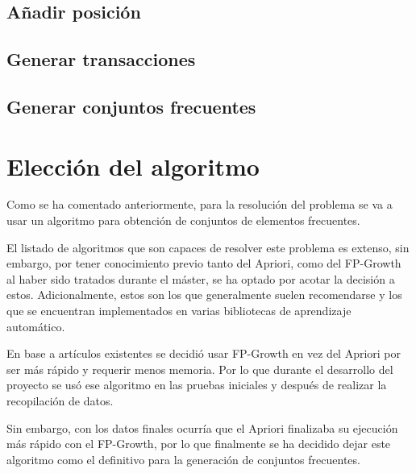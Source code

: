 \subsection{Añadir posición}
\subsection{Generar transacciones}
\subsection{Generar conjuntos frecuentes}


\section{Elección del algoritmo}
Como se ha comentado anteriormente, para la resolución del problema se va a usar un algoritmo para obtención de conjuntos de elementos frecuentes.

El listado de algoritmos\cite{chee_jaafar_aziz_hasan_yeoh_2018} que son capaces de resolver este problema es extenso, sin embargo, por tener conocimiento previo tanto del Apriori, como del FP-Growth al haber sido tratados durante el máster, se ha optado por acotar la decisión a estos. Adicionalmente, estos son los que generalmente suelen recomendarse y los que se encuentran implementados en varias bibliotecas de aprendizaje automático.

En base a artículos existentes\cite{chonyy_2020_apriori}\cite{chonyy_2020_fpgrowth} se decidió usar FP-Growth en vez del Apriori por ser más rápido y requerir menos memoria. Por lo que durante el desarrollo del proyecto se usó ese algoritmo en las pruebas iniciales y después de realizar la recopilación de datos.

Sin embargo, con los datos finales ocurría que el Apriori finalizaba su ejecución más rápido con el FP-Growth, por lo que finalmente se ha decidido dejar este algoritmo como el definitivo para la generación de conjuntos frecuentes.
